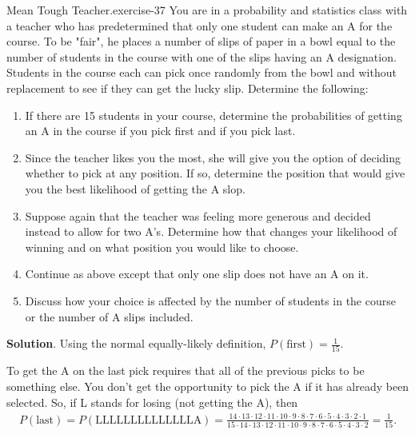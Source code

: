 \documentclass[10pt,]{book}
\numberwithin{equation}{section}
\begin{document}
%
\par
\hypertarget{p-614}{}%
\begin{inlineexercise}{Mean Tough Teacher.}{exercise-37}%
\hypertarget{p-615}{}%
You are in a probability and statistics class with a teacher who has predetermined that only one student can make an A for the course. To be "fair", he places a number of slips of paper in a bowl equal to the number of students in the course with one of the slips having an A designation. Students in the course each can pick once randomly from the bowl and without replacement to see if they can get the lucky slip.  Determine the following: \leavevmode%
\begin{enumerate}
\item\hypertarget{li-163}{}If there are 15 students in your course, determine the probabilities of getting an A in the course if you pick first and if you pick last.%
\item\hypertarget{li-164}{}Since the teacher likes you the most, she will give you the option of deciding whether to pick at any position. If so, determine the position that would give you the best likelihood of getting the A slop.%
\item\hypertarget{li-165}{}Suppose again that the teacher was feeling more generous and decided instead to allow for two A's. Determine how that changes your likelihood of winning and on what position you would like to choose.%
\item\hypertarget{li-166}{}Continue as above except that only one slip does not have an A on it.%
\item\hypertarget{li-167}{}Discuss how your choice is affected by the number of students in the course or the number of A slips included.%
\end{enumerate}
%
\par\smallskip%
\noindent\textbf{Solution}.\hypertarget{solution-14}{}\quad%
\hypertarget{p-616}{}%
Using the normal equally-likely definition, \(P(\text{first}) = \frac{1}{15}\).%
\par
\hypertarget{p-617}{}%
To get the A on the last pick requires that all of the previous picks to be something else. You don't get the opportunity to pick the A if it has already been selected. So, if L stands for losing (not getting the A), then%
\begin{gather*}
P(\text{last}) = P(\text{LLLLLLLLLLLLLLA}) = \frac{14 \cdot 13 \cdot 12 \cdot 11 \cdot 10 \cdot 9  \cdot 8  \cdot 7  \cdot 6  \cdot 5  \cdot 4  \cdot 3 \cdot 2  \cdot 1}{15 \cdot 14 \cdot 13 \cdot 12 \cdot 11 \cdot 10 \cdot 9 \cdot 8 \cdot 7 \cdot 6 \cdot 5 \cdot 4 \cdot 3 \cdot 2} = \frac{1}{15}.

\end{gather*}
\end{inlineexercise}
\end{document}

